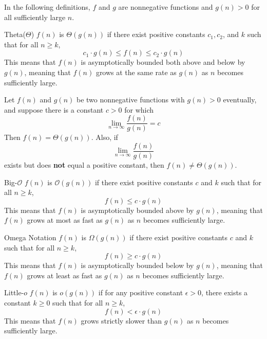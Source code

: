 
In the following definitions, $f$ and $g$ are nonnegative functions and $g(n)>0$ for all sufficiently large $n$.

\begin{definition}{Theta(\(\Theta\))}
    $f(n)$ is $\Theta(g(n))$ if there exist positive constants $c_1, c_2$, and $k$ such that for all $n \geq k$,
    \medskip
    \[
    c_1 \cdot g(n) \leq f(n) \leq c_2 \cdot g(n)
    \]
    \medskip
This means that $f(n)$ is asymptotically bounded both above and below by $g(n)$, meaning that $f(n)$ grows at the same rate as $g(n)$ as $n$ becomes sufficiently large.
\end{definition}

\begin{proposition} 
    Let $f(n)$ and $g(n)$ be two nonnegative functions with $g(n)>0$ eventually, and suppose there is a constant $c>0$ for which
    \medskip
    \[
    \lim _{n \rightarrow \infty} \frac{f(n)}{g(n)}=c
    \]
    \medskip
    Then $f(n)=\Theta(g(n))$. Also, if
    \medskip
    \[
    \lim _{n \rightarrow \infty} \frac{f(n)}{g(n)}
    \]
    \medskip
    exists but does \textbf{not} equal a positive constant, then $f(n) \neq \Theta(g(n))$.
\end{proposition}

\begin{definition}{Big-$\mathcal{O}$}
    $f(n)$ is $\mathcal{O}(g(n))$ if there exist positive constants $c$ and $k$ such that for all $n \geq k$,
    \medskip
    \[
    f(n) \leq c \cdot g(n)
    \]
    \medskip
    This means that $f(n)$ is asymptotically bounded above by $g(n)$, meaning that $f(n)$ grows at most as fast as $g(n)$ as $n$ becomes sufficiently large.
\end{definition}

\begin{definition}{Omega Notation}
    $f(n)$ is $\Omega(g(n))$ if there exist positive constants $c$ and $k$ such that for all $n \geq k$,
    \medskip
    \[
    f(n) \geq c \cdot g(n)
    \]
    \medskip
    This means that $f(n)$ is asymptotically bounded below by $g(n)$, meaning that $f(n)$ grows at least as fast as $g(n)$ as $n$ becomes sufficiently large.
\end{definition}

\begin{definition}{Little-$o$}
    $f(n)$ is $o(g(n))$ if for any positive constant $\epsilon > 0$, there exists a constant $k \geq 0$ such that for all $n \geq k$,
    \medskip
    \[
    f(n) < \epsilon \cdot g(n)
    \]
    \medskip
    This means that $f(n)$ grows strictly slower than $g(n)$ as $n$ becomes sufficiently large.
    
\end{definition}

